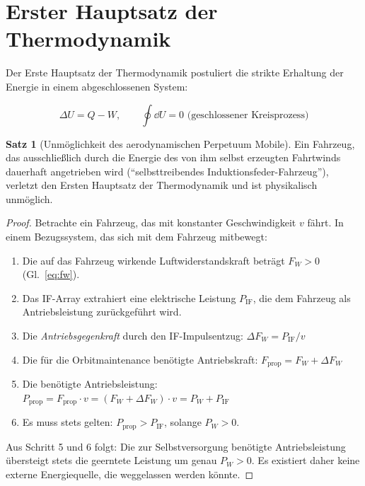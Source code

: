 ﻿\documentclass[12pt, a4paper]{report}
\theoremstyle{definition}
\newtheorem{theorem}{Satz}[section]
\theoremstyle{remark}
\begin{document}
\section{Erster Hauptsatz der Thermodynamik}

Der Erste Hauptsatz der Thermodynamik postuliert die strikte Erhaltung der
Energie in einem abgeschlossenen System:

\begin{equation}
  \Delta U = Q - W, \qquad \oint \dd U = 0 \text{ (geschlossener Kreisprozess)}
  \label{eq:1hs}
\end{equation}

\begin{theorem}[Unmöglichkeit des aerodynamischen Perpetuum Mobile]
  \label{thm:pm}
  Ein Fahrzeug, das ausschließlich durch die Energie des von ihm selbst
  erzeugten Fahrtwinds dauerhaft angetrieben wird (``selbsttreibendes
  Induktionsfeder-Fahrzeug''), verletzt den Ersten Hauptsatz der
  Thermodynamik und ist physikalisch unmöglich.
\end{theorem}

\begin{proof}
  Betrachte ein Fahrzeug, das mit konstanter Geschwindigkeit $v$ fährt.
  In einem Bezugssystem, das sich mit dem Fahrzeug mitbewegt:

  \begin{enumerate}
    \item Die auf das Fahrzeug wirkende Luftwiderstandskraft beträgt $F_W > 0$
          (Gl.~\eqref{eq:fw}).
    \item Das IF-Array extrahiert eine elektrische Leistung $P_{\text{IF}}$,
          die dem Fahrzeug als Antriebsleistung zurückgeführt wird.
    \item Die \emph{Antriebs\-gegenkraft} durch den IF-Impulsentzug:
          $\Delta F_W = P_{\text{IF}}/v$
    \item Die für die Orbitmaintenance benötigte Antriebskraft:
          $F_{\text{prop}} = F_W + \Delta F_W$
    \item Die benötigte Antriebsleistung:
          $P_{\text{prop}} = F_{\text{prop}} \cdot v = (F_W + \Delta F_W) \cdot v
          = P_W + P_{\text{IF}}$
    \item Es muss stets gelten: $P_{\text{prop}} > P_{\text{IF}}$,
          solange $P_W > 0$.
  \end{enumerate}

  Aus Schritt 5 und 6 folgt: Die zur Selbstversorgung benötigte Antriebsleistung
  übersteigt stets die geerntete Leistung um genau $P_W > 0$. Es existiert
  daher keine externe Energiequelle, die weggelassen werden könnte. 
\end{proof}
\end{document}
